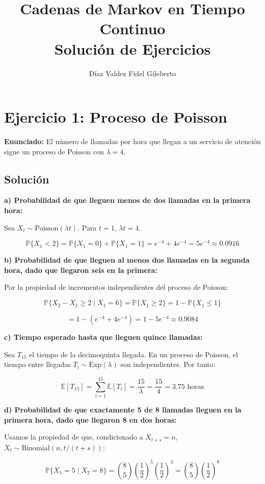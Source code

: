 \documentclass{article}
\title{Cadenas de Markov en Tiempo Continuo\\\large{Solución de Ejercicios}}
\author{Díaz Valdez Fidel Gileberto}
\date{}
\theoremstyle{definition}
\newcommand{\E}{\mathbb{E}}
\newcommand{\Prob}{\mathbb{P}}
\begin{document}
\maketitle

\section*{Ejercicio 1: Proceso de Poisson}

\textbf{Enunciado:} El número de llamadas por hora que llegan a un servicio de atención sigue un proceso de Poisson con $\lambda = 4$.

\subsection*{Solución}

\textbf{a) Probabilidad de que lleguen menos de dos llamadas en la primera hora:}

Sea $X_t \sim \text{Poisson}(\lambda t)$. Para $t=1$, $\lambda t = 4$.

\[
\Prob\{X_1 < 2\} = \Prob\{X_1 = 0\} + \Prob\{X_1 = 1\} = e^{-4} + 4e^{-4} = 5e^{-4} \approx 0.0916
\]

\textbf{b) Probabilidad de que lleguen al menos dos llamadas en la segunda hora, dado que llegaron seis en la primera:}

Por la propiedad de incrementos independientes del proceso de Poisson:

\[
\Prob\{X_2 - X_1 \geq 2 \mid X_1 = 6\} = \Prob\{X_1 \geq 2\} = 1 - \Prob\{X_1 \leq 1\}
\]

\[
= 1 - (e^{-4} + 4e^{-4}) = 1 - 5e^{-4} \approx 0.9084
\]

\textbf{c) Tiempo esperado hasta que lleguen quince llamadas:}

Sea $T_{15}$ el tiempo de la decimoquinta llegada. En un proceso de Poisson, el tiempo entre llegadas $T_i \sim \text{Exp}(\lambda)$ son independientes. Por tanto:

\[
\E[T_{15}] = \sum_{i=1}^{15} \E[T_i] = \frac{15}{\lambda} = \frac{15}{4} = 3.75 \text{ horas}
\]

\textbf{d) Probabilidad de que exactamente 5 de 8 llamadas lleguen en la primera hora, dado que llegaron 8 en dos horas:}

Usamos la propiedad de que, condicionado a $X_{t+s} = n$, $X_t \sim \text{Binomial}(n, t/(t+s))$:

\[
\Prob\{X_1 = 5 \mid X_2 = 8\} = \binom{8}{5} \left(\frac{1}{2}\right)^5 \left(\frac{1}{2}\right)^3 = \binom{8}{5} \left(\frac{1}{2}\right)^8
\]
\end{document}
